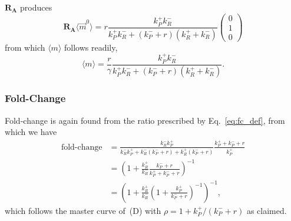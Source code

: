 $\mathbf{R_A}$ produces
\begin{equation}
\mathbf{R_A} \langle\vec{m}^0\rangle
= r \frac{k_P^+ k_R^-} {k_P^+ k_R^- + (k_P^- + r)(k_R^+ + k_R^-)}
\begin{pmatrix} 0 \\ 1 \\ 0 \end{pmatrix}
\end{equation}
from which $\langle{m}\rangle$ follows readily,
\begin{equation}
\langle{m}\rangle = \frac{r}{\gamma}
        \frac{k_P^+ k_R^-} {k_P^+ k_R^- + (k_P^- + r)(k_R^+ + k_R^-)}.
\label{eq:model2_meanm_appdx}
\end{equation}

\subsubsection{Fold-Change}
Fold-change is again found from the ratio prescribed by Eq.~\ref{eq:fc_def},
from which we have
\begin{align}
\text{fold-change}
&=      \frac{k_R^- k_P^+}
        {k_R^- k_P^+ + k_R^- (k_P^- + r) + k_R^+ (k_P^- + r)}
        \frac{k_P^+ + k_P^- + r}{k_P^+}
\\
&=      \left(1 + \frac{k_R^+}{k_R^-}
                \frac{k_P^- + r}{k_P^+ + k_P^- + r}
        \right)^{-1}
\\
&=      \left(1 + \frac{k_R^+}{k_R^-}
        \left(1 + \frac{k_P^+}{k_P^- + r}\right)^{-1}
        \right)^{-1},
\end{align}
which follows the master curve of~(D) with $\rho = 1 +
k_P^+/(k_P^- + r)$ as claimed.

